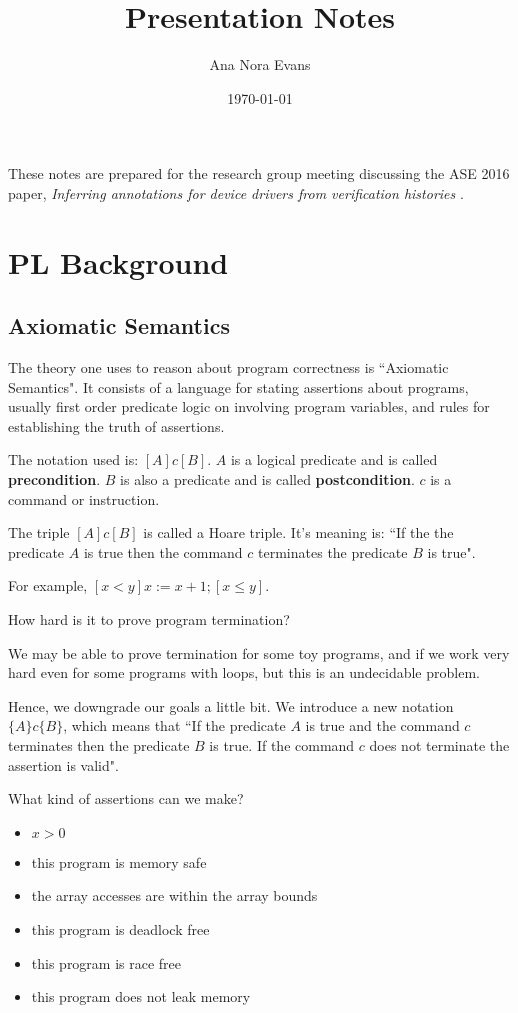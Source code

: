 \documentclass[12pt]{article}
\begin{document}
\title{Presentation Notes}
\author{Ana Nora Evans}
\date{\today}
\maketitle
\thispagestyle{empty}

These notes are prepared for the research group meeting discussing the ASE 2016 paper, \textit{Inferring annotations for device drivers from verification histories} \cite{paper}. 

\section{PL Background}

\subsection{Axiomatic Semantics}
The theory one uses to reason about program correctness is ``Axiomatic Semantics". It consists of a language for stating assertions about programs, usually first order predicate logic on involving program variables, and rules for establishing the truth of assertions. 

The notation used is: $[A]c[B]$. $A$ is a logical predicate and is called \textbf{precondition}. $B$ is also a predicate and is called \textbf{postcondition}. $c$ is a command or instruction.

The triple $[A]c[B]$ is called a Hoare triple. It's meaning is: ``If the the predicate $A$ is true then the command $c$ terminates the predicate $B$ is true".

For example, $[x<y]x:=x+1;[x \leq y]$.

How hard is it to prove program termination?

We may be able to prove termination for some toy programs, and if we work very hard even for some programs with loops, but this is an undecidable problem.

Hence, we downgrade our goals a little bit. We introduce a new notation $\{A\}c\{B\}$, which means that ``If the predicate $A$ is true and the command $c$ terminates then the predicate $B$ is true. If the command $c$ does not terminate the assertion is valid".  

What kind of assertions can we make?
\begin{itemize}
\item $x>0$
\item this program is memory safe
\item the array accesses are within the array bounds 
\item this program is deadlock free
\item this program is race free
\item this program does not leak memory
\end{itemize}
\end{document}
